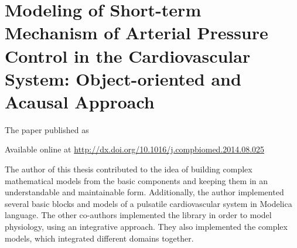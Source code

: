 \chapter{Modeling of Short-term Mechanism of Arterial Pressure Control in the Cardiovascular System: Object-oriented and Acausal Approach}\label{app:modeling}
The paper \cite{Kulhanek2014Modeling} published as
 

Available online at \url{http://dx.doi.org/10.1016/j.compbiomed.2014.08.025}

The author of this thesis contributed to the idea of building complex mathematical models from the basic components and keeping them in an understandable and maintainable form. Additionally, the author implemented several basic blocks and models of a pulsatile cardiovascular system in Modelica language. The other co-authors implemented the library in order to model physiology, using an integrative approach. They also implemented the complex models, which integrated different domains together.

